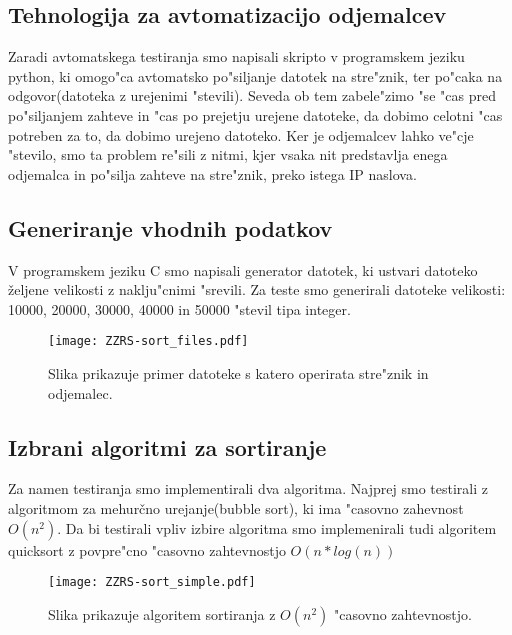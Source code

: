 \subsection{Tehnologija za avtomatizacijo odjemalcev}
Zaradi avtomatskega testiranja smo napisali skripto v programskem jeziku python, ki omogo"ca avtomatsko po"siljanje datotek na stre"znik, ter po"caka na odgovor(datoteka z urejenimi "stevili). Seveda ob tem zabele"zimo "se "cas pred po"siljanjem zahteve in "cas po prejetju urejene datoteke, da dobimo celotni "cas potreben za to, da dobimo urejeno datoteko. Ker je odjemalcev lahko ve"cje "stevilo, smo ta problem re"sili z nitmi, kjer vsaka nit predstavlja enega odjemalca in po"silja zahteve na stre"znik, preko istega IP naslova.

\subsection{Generiranje vhodnih podatkov}
V programskem jeziku C smo napisali generator datotek, ki ustvari datoteko željene velikosti z naklju"cnimi "srevili. Za teste smo generirali datoteke velikosti: 10000, 20000, 30000, 40000 in 50000 "stevil tipa integer.

\begin{figure} [!h]
  \centering
    \texttt{[image: ZZRS-sort\_files.pdf]} 
  \caption{Slika prikazuje primer datoteke s katero operirata stre"znik in odjemalec.}
  \label{8_files}  
\end{figure}

\subsection{Izbrani algoritmi za sortiranje}
Za namen testiranja smo implementirali dva algoritma. Najprej smo testirali z algoritmom za mehurčno urejanje(bubble sort), ki ima "casovno zahevnost $O(n^2)$.
Da bi testirali vpliv izbire algoritma smo implemenirali tudi algoritem quicksort z povpre"cno "casovno zahtevnostjo $O(n* log(n))$

\begin{figure}  [!h]
  \centering
    \texttt{[image: ZZRS-sort\_simple.pdf]}
  \caption{Slika prikazuje algoritem sortiranja z $O(n^2)$ "casovno zahtevnostjo.}
  \label{8_sort}  
\end{figure}


